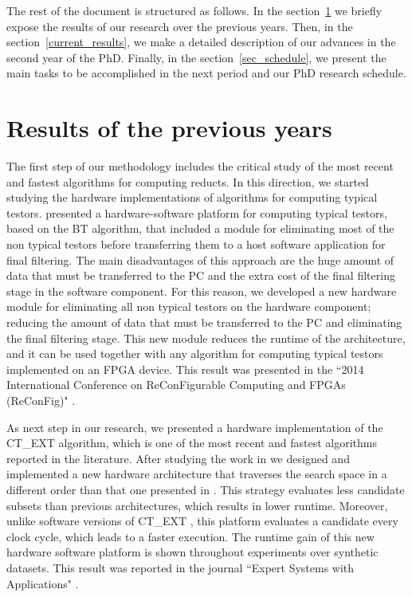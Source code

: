 \documentclass[authoryear,11pt]{elsarticle}
\begin{document}
  The rest of the document is structured as follows. In the section~\ref{previous_results} we briefly expose the results of our research over the previous years. Then, in the section~\ref{current_results}, we make a detailed description of our advances in the second year of the PhD. Finally, in the section~\ref{sec_schedule}, we present the main tasks to be accomplished in the next period and our PhD research schedule.
  
  \section{Results of the previous years}\label{previous_results}
  
  The first step of our methodology includes the critical study of the most recent and fastest algorithms for computing reducts. In this direction, we started studying the hardware implementations of algorithms for computing typical testors. \cite{Rojas12} presented a hardware-software platform for computing typical testors, based on the BT algorithm, that included a module for eliminating most of the non typical testors before transferring them to a host software application for final filtering. The main disadvantages of this approach are the huge amount of data that must be transferred to the PC and the extra cost of the final filtering stage in the software component.  For this reason, we developed a new hardware module for eliminating all non typical testors on the hardware	component; reducing the amount of data that must be transferred to the PC and eliminating the final filtering	stage. 	This new module reduces the runtime of the architecture, and it can be used together with any algorithm for computing typical testors implemented on an FPGA device. This result was presented in the ``2014 International Conference on ReConFigurable Computing and FPGAs (ReConFig)"  \citep{Rodriguez14}. 
  
  As next step in our research, we presented a hardware implementation of the CT\_EXT algorithm, which is one of the most recent and fastest algorithms reported in the literature. After studying the work in \citep{Rojas12} we designed and implemented a new hardware architecture that traverses the search space in a different order than that one presented in \citep{Rojas07, Rojas12,Rodriguez14}. This strategy evaluates less	candidate subsets than previous architectures, which results in lower runtime. Moreover, unlike software versions of CT\_EXT \citep{Sanchez07, Sanchez10}, this platform evaluates a candidate every clock cycle, which leads to a faster execution. The runtime gain of this new hardware software platform is shown throughout experiments over synthetic datasets. This result was reported in the journal ``Expert Systems with Applications"  \citep{Rodriguez15}.
  
\end{document}
